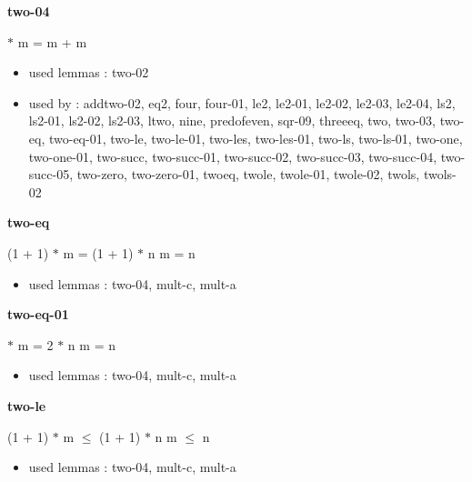 \documentclass[a4paper]{article}
\begin{document}
\medskip

\bigskip

{\large\bf two-04}

\medskip

  $*$ m = m + m

\begin{itemize}


\item       used lemmas  : two-02
\item       used by      : addtwo-02, eq2, four, four-01, le2, le2-01, le2-02, le2-03, le2-04, ls2, ls2-01, ls2-02, ls2-03, ltwo, nine, predofeven, sqr-09, threeeq, two, two-03, two-eq, two-eq-01, two-le, two-le-01, two-les, two-les-01, two-ls, two-ls-01, two-one, two-one-01, two-succ, two-succ-01, two-succ-02, two-succ-03, two-succ-04, two-succ-05, two-zero, two-zero-01, twoeq, twole, twole-01, twole-02, twols, twols-02

\end{itemize}

\medskip

\bigskip

{\large\bf two-eq}

\medskip

 \Fol (1 + 1) $*$ m = (1 + 1) $*$ n \Equiv m = n

\begin{itemize}


\item       used lemmas  : two-04, mult-c, mult-a

\end{itemize}

\medskip

\bigskip

{\large\bf two-eq-01}

\medskip

  $*$ m = 2 $*$ n \Equiv m = n

\begin{itemize}


\item       used lemmas  : two-04, mult-c, mult-a

\end{itemize}

\medskip

\bigskip

{\large\bf two-le}

\medskip

 \Fol (1 + 1) $*$ m $\le$ (1 + 1) $*$ n \Equiv m $\le$ n

\begin{itemize}


\item       used lemmas  : two-04, mult-c, mult-a

\end{itemize}
\end{document}
